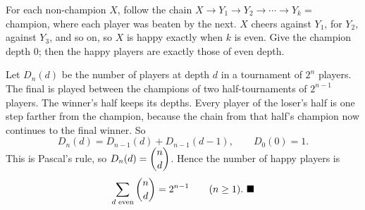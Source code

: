 For each non-champion $X$, follow the chain $X\to Y_1\to Y_2\to\cdots\to Y_k=$ champion, where each player was beaten by the next. $X$ cheers against $Y_1$, for $Y_2$, against $Y_3$, and so on, so $X$ is happy exactly when $k$ is even. Give the champion depth $0$; then the happy players are exactly those of even depth.

Let $D_n(d)$ be the number of players at depth $d$ in a tournament of $2^n$ players. The final is played between the champions of two half-tournaments of $2^{n-1}$ players. The winner's half keeps its depths. Every player of the loser's half is one step farther from the champion, because the chain from that half's champion now continues to the final winner. So
\[D_n(d)=D_{n-1}(d)+D_{n-1}(d-1),\qquad D_0(0)=1.\]
This is Pascal's rule, so $D_n(d)=\dbinom nd$. Hence the number of happy players is
\[\sum_{d\text{ even}}\dbinom nd=2^{n-1}\qquad(n\ge1).\ \blacksquare\]
